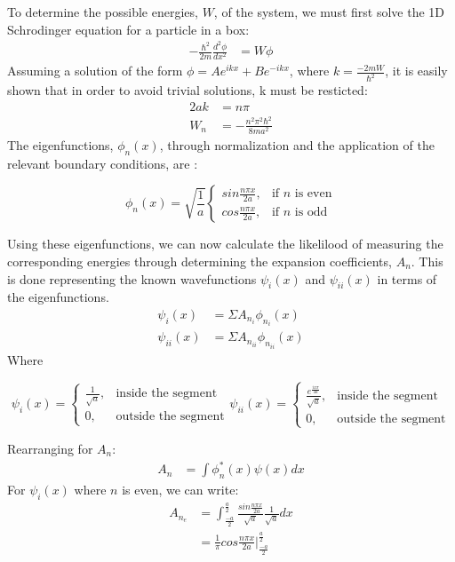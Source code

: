 \documentclass{article}
\numberwithin{equation}{section}
\begin{document}
\large
To determine the possible energies, $W$, of the system, we must first solve the 1D Schrodinger equation for a particle in a box:
\begin{align*}
	-\frac{\hbar^2}{2m}\frac{d^2\phi}{dx^2} &= W\phi
\end{align*}
Assuming a solution of the form $\phi=Ae^{ikx}+Be^{-ikx}$, where $k=\frac{-2mW}{\hbar^2}$, it is easily shown that in order to avoid trivial solutions, k must be resticted:
\begin{align*}
	2ak&=n\pi
\\	W_{n}&=-\frac{n^2\pi^2\hbar^2}{8ma^2}
\end{align*}
The eigenfunctions, $\phi_n(x)$, through normalization and the application of the relevant boundary conditions, are :
\begin{center}
$$
\phi_n(x) =\sqrt{\frac{1}{a}}
\begin{cases}
sin \frac{n\pi x}{2a}, & \text{if }n\text{ is even} \\
cos \frac{n\pi x}{2a}, & \text{if }n\text{ is odd}
\end{cases}
$$
\end{center}
Using these eigenfunctions, we can now calculate the likelilood of measuring the corresponding energies through determining the expansion coefficients, $A_n$. This is done representing the known wavefunctions $\psi_{i}(x)$ and $\psi_{ii}(x)$ in terms of the eigenfunctions.
\begin{align*}
	\psi_{i}(x)&=\Sigma A_{n_i} \phi_{n_i}(x)
\\	\psi_{ii}(x)&=\Sigma A_{n_{ii}} \phi_{n_{ii}}(x)
\end{align*}
Where
\begin{center}
$$
\psi_{i}(x) =
\begin{cases}
\frac{1}{\sqrt{a}}, & \text{inside the segment} \\
0, & \text{outside the segment}
\end{cases}
\psi_{ii}(x) =
\begin{cases}
\frac{e^{\frac{ix\pi}{4a}}}{\sqrt{a}}, & \text{inside the segment} \\
0, & \text{outside the segment}
\end{cases}
$$
\end{center}
Rearranging for $A_n$:
\begin{align*}
	A_n&=\int \phi_n^*(x)\psi(x)dx
\end{align*}
For $\psi_{i}(x)$ where $n$ is even, we can write:
\begin{align*}
	A_{n_e}&=\int_{\frac{-a}{2}}^{\frac{a}{2}} \frac{sin \frac{n \pi x}{2a}}{\sqrt{a}}\frac{1}{\sqrt{a}} dx
\\   &=\frac{1}{\pi}cos\frac{n \pi x}{2a}|_{\frac{-a}{2}}^{\frac{a}{2}} 
\end{align*}
\end{document}
